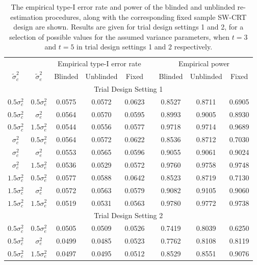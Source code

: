 \documentclass{article}
\begin{document}
\renewcommand{\arraystretch}{1.2}
\begin{table}[htb]
	\begin{center}
		\caption{The empirical type-I error rate and power of the blinded and unblinded re-estimation procedures, along with the corresponding fixed sample SW-CRT design are shown. Results are given for trial design settings 1 and 2, for a selection of possible values for the assumed variance parameters, when $t=3$ and $t=5$ in trial design settings 1 and 2 respectively.}
		\begin{tabular}{ccccccccc}
			\hline
			& & \multicolumn{3}{c}{Empirical type-I error rate} && \multicolumn{3}{c}{Empirical power} \\
			\cline{3-5}\cline{7-9}
			$\tilde{\sigma}_c^2$ & $\tilde{\sigma}_e^2$ & Blinded & Unblinded & Fixed && Blinded & Unblinded & Fixed\\
			\hline
			\multicolumn{9}{c}{Trial Design Setting 1}\\
			\hline
			$0.5\sigma_c^2$ & $0.5\sigma_e^2$ & 0.0575 & 0.0572 & 0.0623 && 0.8527 & 0.8711 & 0.6905 \\
			$0.5\sigma_c^2$ & $\sigma_e^2$ & 0.0564 & 0.0570 & 0.0595 && 0.8993 & 0.9005 & 0.8930 \\
			$0.5\sigma_c^2$ & $1.5\sigma_e^2$ & 0.0544 & 0.0556 & 0.0577 && 0.9718 & 0.9714 & 0.9689 \\
			$\sigma_c^2$ & $0.5\sigma_e^2$ & 0.0564 & 0.0572 & 0.0622 && 0.8536 & 0.8712 & 0.7030 \\
			$\sigma_c^2$ & $\sigma_e^2$ & 0.0553 & 0.0565 & 0.0596 && 0.9055 & 0.9061 & 0.9024 \\
			$\sigma_c^2$ & $1.5\sigma_e^2$ & 0.0536 & 0.0529 & 0.0572 && 0.9760 & 0.9758 & 0.9748 \\
			$1.5\sigma_c^2$ & $0.5\sigma_e^2$ & 0.0577 & 0.0588 & 0.0642 && 0.8523 & 0.8719 & 0.7130 \\
			$1.5\sigma_c^2$ & $\sigma_e^2$ & 0.0572 & 0.0563 & 0.0579 && 0.9082 & 0.9105 & 0.9060 \\
			$1.5\sigma_c^2$ & $1.5\sigma_e^2$ & 0.0519 & 0.0531 & 0.0563 && 0.9780 & 0.9772 & 0.9738 \\
			\hline
			\multicolumn{9}{c}{Trial Design Setting 2}\\
			\hline
			$0.5\sigma_c^2$ & $0.5\sigma_e^2$ & 0.0505 & 0.0509 & 0.0526 && 0.7419 & 0.8039 & 0.6250 \\
			$0.5\sigma_c^2$ & $\sigma_e^2$ & 0.0499 & 0.0485 & 0.0523 && 0.7762 & 0.8108 & 0.8119 \\
			$0.5\sigma_c^2$ & $1.5\sigma_e^2$ & 0.0497 & 0.0495 & 0.0512 && 0.8529 & 0.8551 & 0.9076 \\

\end{tabular}
\end{center}
\end{table}
\end{document}
